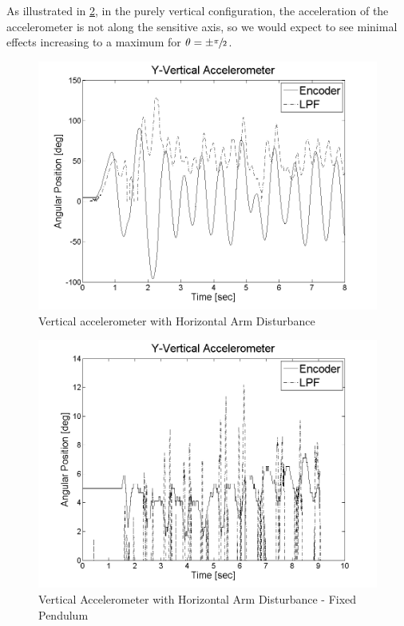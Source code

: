 \documentclass{article}
\theoremstyle{plain}
\theoremstyle{definition}
\theoremstyle{remark}
\begin{document}
As illustrated in \ref{Y_PendulumFixed_Dist}, in the purely vertical configuration, the acceleration of the accelerometer is not along the sensitive axis, so we would expect to see minimal effects increasing to a maximum for $\theta = \pm \sfrac{\pi}{2}$.

\begin{figure}[hbt]
\begin{center}
\includegraphics[width = 12cm]{Y_Vertical_Dist2.png}
\caption{Vertical accelerometer with Horizontal Arm Disturbance}
\label{Y_Vertical_Dist2}
\end{center}
\end{figure}

\begin{figure}[hbt]
\begin{center}
\includegraphics[width = 12cm]{Y_PendulumFixed_Dist.png}
\caption{Vertical Accelerometer with Horizontal Arm Disturbance - Fixed Pendulum}
\label{Y_PendulumFixed_Dist}
\end{center}
\end{figure}
\end{document}
